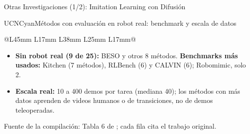 \documentclass[aspectratio=169,10pt,xcolor={dvipsnames,table}]{beamer}
\begin{document}
\begin{frame}{Otras Investigaciones (1/2): Imitation Learning con Difusión}
\begin{Card}{UCNCyan}{Métodos con evaluación en robot real: benchmark y escala de datos}
{\begin{tabular}{@{}L{45mm} L{17mm} L{38mm} L{25mm} L{17mm}@{}}
      \bottomrule
    \end{tabular}\par
    \vspace{1mm}
    \begin{itemize}\setlength{\itemsep}{0.6pt}
      \item[\textcolor{UCNCyan}{$\blacksquare$}] \textbf{Sin robot real (9 de 25):} BESO \cite{reuss2023beso} y otros 8 métodos. \textbf{Benchmarks más usados:} Kitchen (7 métodos), RLBench (6) y CALVIN (6); Robomimic, solo 2.
      \item[\textcolor{UCNCyan}{$\blacksquare$}] \textbf{Escala real:} 10 a 400 demos por tarea (mediana 40); los métodos con más datos aprenden de videos humanos o de transiciones, no de demos teleoperadas.
    \end{itemize}
    \textcolor{TextDark!75}{Fuente de la compilación: Tabla 6 de \cite{wolf2025survey}; cada fila cita el trabajo original.}\par}
  \end{Card}
\end{frame}
\end{document}

